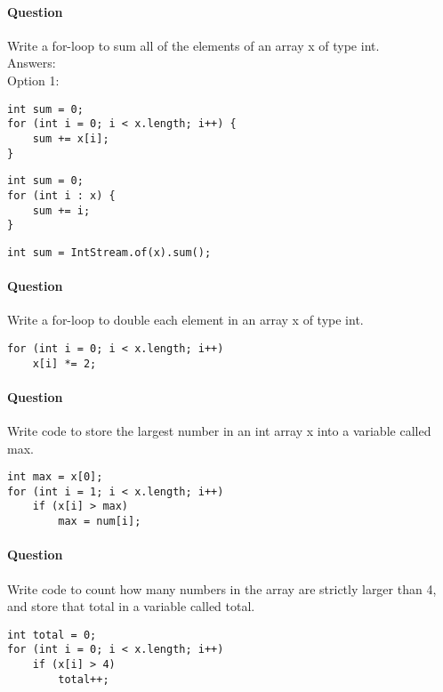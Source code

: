 \documentclass{article}
\begin{document}
\addtocounter{question_num}{1}
\paragraph{Question }
Write a for-loop to sum all of the elements of an array x of type int.
\\ {\color{red}Answers:
\\
Option 1:
}
\begin{lstlisting}
int sum = 0;
for (int i = 0; i < x.length; i++) {
	sum += x[i];
}
\end{lstlisting}

\begin{lstlisting}
int sum = 0;
for (int i : x) {
	sum += i;
}
\end{lstlisting}

\begin{lstlisting}
int sum = IntStream.of(x).sum();
\end{lstlisting}

\addtocounter{question_num}{1}
\paragraph{Question }
Write a for-loop to double each element in an array x of type int.
\begin{lstlisting}
for (int i = 0; i < x.length; i++)
	x[i] *= 2;
\end{lstlisting}

\addtocounter{question_num}{1}
\paragraph{Question }
Write code to store the largest number in an int array x into a variable called max.
\begin{lstlisting}
int max = x[0];
for (int i = 1; i < x.length; i++)
	if (x[i] > max)
		max = num[i];
\end{lstlisting}


\addtocounter{question_num}{1}
\paragraph{Question }
Write code to count how many numbers in the array are strictly larger than 4, and store that total in a variable called total.
\begin{lstlisting}
int total = 0;
for (int i = 0; i < x.length; i++)
	if (x[i] > 4)
		total++;
\end{lstlisting}
\end{document}
